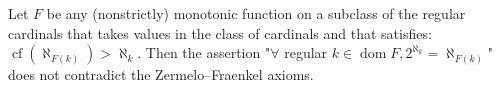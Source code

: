 Let $F$ be any (nonstrictly) monotonic function on a subclass of the regular cardinals that takes values in the class of cardinals and that satisfies: $\operatorname{cf} (\aleph_{F(k)}) > \aleph_k$. Then the assertion "$\forall$ regular $k \in \operatorname{dom} F, 2^{\aleph_k} = \aleph_{F(k)}$" does not contradict the Zermelo--Fraenkel axioms.
